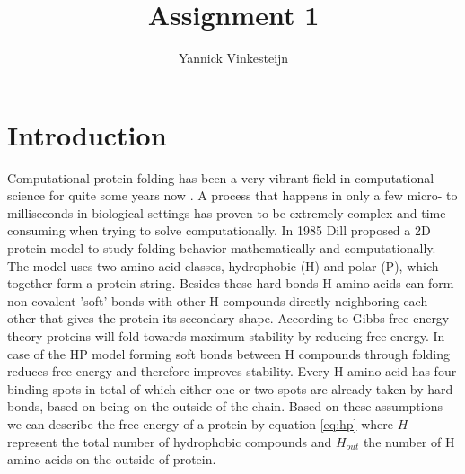 \documentclass{article}
\begin{document}
\title{Assignment 1}
\author{Yannick Vinkesteijn}

\maketitle

\section{Introduction}

Computational protein folding has been a very vibrant field in computational science for quite some years now . A process that happens in only a few micro- to milliseconds in biological settings has proven to be extremely complex and time consuming when trying to solve computationally. In 1985 Dill proposed a 2D protein model to study folding behavior mathematically and computationally. The model uses two amino acid classes, hydrophobic (H) and polar (P), which together form a protein string. Besides these hard bonds H amino acids can form non-covalent 'soft' bonds with other H compounds directly neighboring each other that gives the protein its secondary shape. According to Gibbs free energy theory proteins will fold towards maximum stability by reducing free energy. In case of the HP model forming soft bonds between H compounds through folding reduces free energy and therefore improves stability. Every H amino acid has four binding spots in total of which either one or two spots are already taken by hard bonds, based on being on the outside of the chain. Based on these assumptions we can describe the free energy of a protein by equation \ref{eq:hp} where $H$ represent the total number of hydrophobic compounds and $H_{out}$ the number of H amino acids on the outside of protein. 




\end{document}
